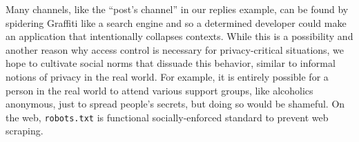 Many channels, like the ``post's channel'' in our replies example,
can be found by spidering Graffiti like a search engine and so a determined
developer could make an application that intentionally collapses contexts.
While this is a possibility and another reason why access control is necessary for privacy-critical situations, we hope to cultivate social norms that dissuade this behavior, similar to informal notions of privacy in the real world.
For example, it is entirely possible for a person in the real world
to attend various support groups, like alcoholics anonymous,
just to spread people's secrets, but doing so would be shameful.
On the web, \texttt{robots.txt} is functional socially-enforced standard
to prevent web scraping.







